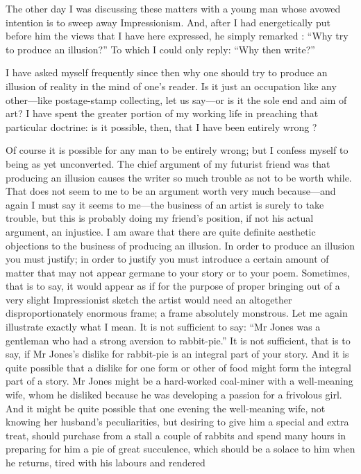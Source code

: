The other day I was discussing these matters with a young man whose
avowed intention is to sweep away Impressionism. And, after I had
energetically put before him the views that I have here expressed, he
simply remarked : ``Why try to produce an illusion?'' To which I could
only reply: ``Why then write?''

I have asked myself frequently since then why one should try to produce
an illusion of reality in the mind of one's reader. Is it just an
occupation like any other---like postage-stamp collecting, let us
say---or is it the sole end and aim of art? I have spent the greater
portion of my working life in preaching that particular doctrine: is it
possible, then, that I have been entirely wrong ?

Of course it is possible for any man to be entirely wrong; but I confess
myself to being as yet unconverted. The chief argument of my futurist
friend was that producing an illusion causes the writer so much trouble
as not to be worth while. That does not seem to me to be an argument
worth very much because---and again I must say it seems to me---the
business of an artist is surely to take trouble, but this is probably
doing my friend's position, if not his actual argument, an injustice. I
am aware that there are quite definite aesthetic objections to the
business of producing an illusion. In order to produce an illusion you
must justify; in order to justify you must introduce a certain amount of
matter that may not appear germane to your story or to your poem.
Sometimes, that is to say, it would appear as if for the purpose of
proper bringing out of a very slight Impressionist sketch the artist
would need an altogether disproportionately enormous frame; a frame
absolutely monstrous. Let me again illustrate exactly what I mean. It is
not sufficient to say: ``Mr Jones was a gentleman who had a strong
aversion to rabbit-pie.'' It is not sufficient, that is to say, if Mr
Jones's dislike for rabbit-pie is an integral part of your story. And it
is quite possible that a dislike for one form or other of food might
form the integral part of a story. Mr Jones might be a hard-worked
coal-miner with a well-meaning wife, whom he disliked because he was
developing a passion for a frivolous girl. And it might be quite
possible that one evening the well-meaning wife, not knowing her
husband's peculiarities, but desiring to give him a special and extra
treat, should purchase from a stall a couple of rabbits and spend many
hours in preparing for him a pie of great succulence, which should be a
solace to him when he returns, tired with his labours and rendered
